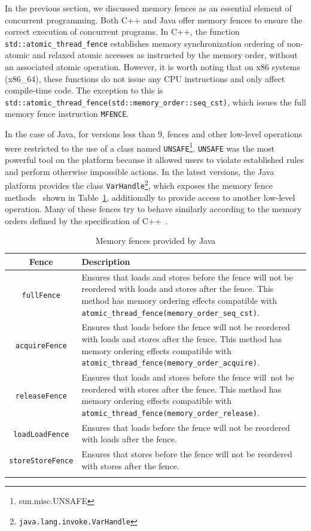 In the previous section, we discussed memory fences as an essential element of concurrent programming. Both C++ and Java offer memory fences to ensure the correct execution of concurrent programs. In C++, the function \texttt{std::atomic\_thread\_fence} establishes memory synchronization ordering of non-atomic and relaxed atomic accesses as instructed by the memory order, without an associated atomic operation. However, it is worth noting that on x86 systems (x86\_64), these functions do not issue any CPU instructions and only affect compile-time code. The exception to this is \texttt{std::atomic\_thread\_fence(std::memory\_order::seq\_cst)}, which issues the full memory fence instruction \texttt{MFENCE}.


In the case of Java, for versions less than 9, fences and other low-level operations were restricted to the use of a class named \texttt{UNSAFE}\footnote{sun.misc.UNSAFE}. \texttt{UNSAFE} was the most powerful tool on the platform because it allowed users to violate established rules and perform otherwise impossible actions. In the latest versions, the Java platform provides the class \texttt{VarHandle}\footnote{\texttt{java.lang.invoke.VarHandle}}, which exposes the memory fence methods~\cite{varHandleJdk92017} shown in Table~\ref{table:fences}, additionally to provide access to another low-level operation. Many of these fences try to behave similarly according to the memory orders defined by the specification of C++~\cite{memoryOrderCpp2020}.


  \begin{longtable}{|c|p{.72\linewidth}|}
    \hline
    \textbf{Fence} & \textbf{Description} \\
    \hline
    \texttt{fullFence} & Ensures that loads and stores before the fence will not be reordered with loads and stores after the fence. This method has memory ordering effects compatible with \texttt{atomic\_thread\_fence(memory\_order\_seq\_cst)}.\\
    \hline
    \texttt{acquireFence} & Ensures that loads before the fence will not be reordered with loads and stores after the fence. This method has memory ordering effects compatible with \texttt{atomic\_thread\_fence(memory\_order\_acquire)}.\\
    \hline
    \texttt{releaseFence} & Ensures that loads and stores before the fence will\ not be reordered with stores after the fence. This method has memory ordering effects compatible with  \texttt{atomic\_thread\_fence(memory\_order\_release)}.\\
    \hline
    \texttt{loadLoadFence} & Ensures that loads before the fence will not be reordered with loads after the fence.\\
    \hline
    \texttt{storeStoreFence} & Ensures that stores before the fence will not be reordered with stores after the fence.\\
    \hline
    \caption{\label{table:fences}Memory fences provided by Java}
  \end{longtable}


